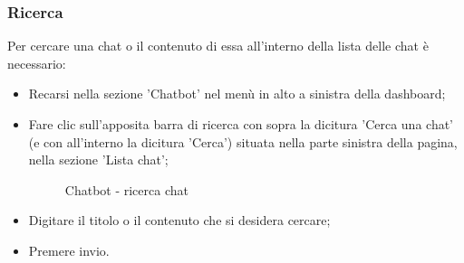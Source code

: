 \documentclass[10pt, a4paper]{article}
\begin{document}
\subsubsection{Ricerca}
\label{sec:searchchat}
Per cercare una chat o il contenuto di essa all'interno della lista delle chat è necessario:
\begin{itemize}
    \item Recarsi nella sezione 'Chatbot' nel menù in alto a sinistra della dashboard;
    \item Fare clic sull'apposita barra di ricerca con sopra la dicitura 'Cerca una chat' (e con all'interno la dicitura 'Cerca') situata nella parte sinistra della pagina, nella sezione 'Lista chat';
    \begin{figure}[H]
        \centering  
        \caption{Chatbot - ricerca chat}
    \end{figure}
    \item Digitare il titolo o il contenuto che si desidera cercare;
    \item Premere invio.
\end{itemize} 
\end{document}
